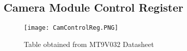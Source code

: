 \subsection{Camera Module Control Register} \label{camctlreg}
\begin{figure}[H]
	\centerline{\texttt{[image: CamControlReg.PNG]}}
	Table obtained from MT9V032 Datasheet \cite{mt9v032}
\end{figure}